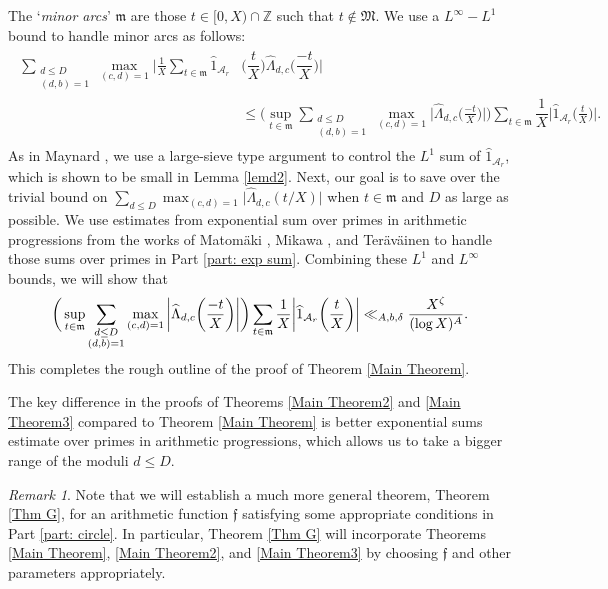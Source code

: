 \documentclass[12pt]{amsart}
\numberwithin{equation}{section}
\theoremstyle{remark}
\newtheorem*{remark}{Remark}
\theoremstyle{definition}
\begin{document}
\medskip

 The `\emph{minor arcs}' $\mathfrak{m}$ are those $t \in [0,X)\cap\mathbb{Z}$ such that $t\not\in\mathfrak{M}$. We use a $L^\infty-L^1$ bound to handle minor arcs as follows:
\begin{align}
\label{minorD}
\begin{split}
\sum_{\substack{d\leq D\\(d, b)=1}}\max_{(c, d)=1} \bigg| \frac{1}{X}\sum_{t\in\mathfrak{m}} \widehat{1}_{\mathcal{A}_r}&\bigg(\dfrac{t}{X}\bigg)\widehat{\Lambda}_{d,c}\bigg(\dfrac{-t}{X}\bigg)\bigg|\\
& \le \bigg(\sup_{t \in \mathfrak{m}}\sum_{\substack{d\leq D\\(d, b)=1}}\max_{(c, d)=1}\bigg|\widehat{\Lambda}_{d,c}\bigg(\frac{-t}{X}\bigg)\bigg|\bigg)\sum_{t\in \mathfrak{m}}\dfrac{1}{X}\bigg|\widehat{1}_{\mathcal{A}_r}\bigg(\frac{t}{X}\bigg)\bigg|.
\end{split}
\end{align}
As in Maynard \cite{May2}, we use a large-sieve type argument to control the $L^1$ sum of $\widehat{1}_{\mathcal{A}_r}$, which is shown to be small in Lemma \ref{lemd2}. Next, our goal is to save over the trivial bound on $\sum_{d\leq D}\max_{(c, d)=1}\Big\lvert\widehat{\Lambda}_{d,c}(t/X)\Big\rvert$ when $t \in \mathfrak{m}$ and $D$ as large as possible. We use estimates from exponential sum over primes in arithmetic progressions from the works of Matom\"aki \cite{Mat}, Mikawa \cite{Mik}, and Ter\"{a}v\"{a}inen \cite{Ter} to handle those sums over primes in Part \ref{part: exp sum}. Combining these $L^1$ and $L^\infty$ bounds, we will show that
\begin{align}
\notag \bigg(\sup_{t \in \mathfrak{m}}\sum_{\substack{d\leq D\\(d, b)=1}}\max_{(c, d)=1}\bigg|\widehat{\Lambda}_{d,c}\bigg(\frac{-t}{X}\bigg)\bigg|\bigg)\sum_{t\in \mathfrak{m}}\dfrac{1}{X}\bigg|\widehat{1}_{\mathcal{A}_r}\bigg(\frac{t}{X}\bigg)\bigg| \ll_{A,b, \delta}\dfrac{X^{\zeta}}{(\log X)^{A}}.
\end{align} 
This completes the rough outline of the proof of Theorem \ref{Main Theorem}.


The key difference in the proofs of Theorems \ref{Main Theorem2} and \ref{Main Theorem3} compared to Theorem \ref{Main Theorem} is better exponential sums estimate over primes in arithmetic progressions, which allows us to take a bigger range of the moduli $d\leq D$. 


\begin{remark}
Note that we will establish a much more general theorem, Theorem \ref{Thm G}, for an arithmetic function $\mathfrak{f}$ satisfying some appropriate conditions in Part \ref{part: circle}. In particular, Theorem \ref{Thm G} will incorporate Theorems \ref{Main Theorem}, \ref{Main Theorem2}, and \ref{Main Theorem3} by choosing $\mathfrak{f}$ and other parameters appropriately.
\end{remark}
\end{document}

